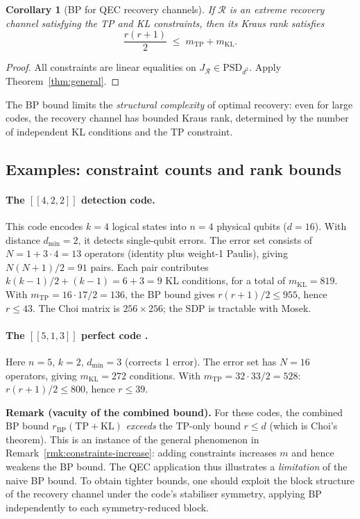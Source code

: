 \documentclass[11pt,a4paper]{article}
\newtheorem{corollary}[theorem]{Corollary}
\theoremstyle{definition}
\newcommand{\PSD}{\mathrm{PSD}}
\begin{document}
\begin{corollary}[BP for QEC recovery channels]\label{cor:qec-bp}
If $\mathcal{R}$ is an extreme recovery channel satisfying the
TP and KL constraints, then its Kraus rank satisfies
\[
  \frac{r(r+1)}{2} \;\leq\; m_{\mathrm{TP}} + m_{\mathrm{KL}}.
\]
\end{corollary}

\begin{proof}
All constraints are linear equalities on $J_\mathcal{R} \in \PSD_{d^2}$.
Apply Theorem~\ref{thm:general}.
\end{proof}

The BP bound limits the \emph{structural complexity} of optimal
recovery: even for large codes, the recovery channel has bounded
Kraus rank, determined by the number of independent KL conditions
and the TP constraint.

\subsection{Examples: constraint counts and rank bounds}

\paragraph{The $[[4,2,2]]$ detection code.}
This code encodes $k = 4$ logical states into $n = 4$ physical
qubits ($d = 16$).  With distance $d_{\min} = 2$, it detects
single-qubit errors.  The error set consists of $N = 1 + 3 \cdot 4
= 13$ operators (identity plus weight-1 Paulis), giving
$N(N{+}1)/2 = 91$ pairs.  Each pair contributes
$k(k{-}1)/2 + (k{-}1) = 6 + 3 = 9$ KL conditions, for a total of
$m_{\mathrm{KL}} = 819$.  With
$m_{\mathrm{TP}} = 16 \cdot 17/2 = 136$, the BP bound gives
$r(r{+}1)/2 \leq 955$, hence $r \leq 43$.  The Choi matrix is
$256 \times 256$; the SDP is tractable with Mosek.

\paragraph{The $[[5,1,3]]$ perfect code \cite{gottesman97}.}
Here $n = 5$, $k = 2$, $d_{\min} = 3$ (corrects 1 error).  The
error set has $N = 16$ operators, giving $m_{\mathrm{KL}} = 272$
conditions.  With $m_{\mathrm{TP}} = 32 \cdot 33/2 = 528$:
$r(r{+}1)/2 \leq 800$, hence $r \leq 39$.

\smallskip
\noindent\textbf{Remark (vacuity of the combined bound).}
For these codes, the combined BP bound $r_{\mathrm{BP}}(\mathrm{TP}
{+}\mathrm{KL})$ \emph{exceeds} the TP-only bound $r \leq d$
(which is Choi's theorem).  This is an instance of the general
phenomenon in Remark~\ref{rmk:constraints-increase}: adding
constraints increases $m$ and hence weakens the BP bound.
The QEC application thus illustrates a \emph{limitation} of the
naive BP bound.  To obtain tighter bounds, one should exploit the
block structure of the recovery channel under the code's stabiliser
symmetry, applying BP independently to each symmetry-reduced block.
\end{document}
